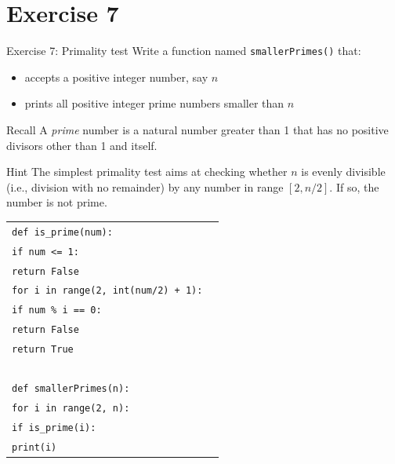 \documentclass[t,handout,9pt]{beamer}
\begin{document}
\section{Exercise 7}
\begin{frame}{Exercise 7: Primality test}
\vfill
Write a function named \texttt{smallerPrimes()} that:
\begin{itemize}
	\item accepts a positive integer number, say $n$
	\item prints all positive integer prime numbers smaller than $n$
\end{itemize}
\vfill
\begin{block}{Recall}
A \textit{prime} number is a natural number greater than 1 that has no positive divisors other than 1 and itself.
\end{block}
\begin{block}{Hint}
The simplest primality test aims at checking whether $n$ is evenly divisible (i.e., division with no remainder) by any number in range $[2, n/2]$. If so, the number is not prime.
\end{block}
\vfill
\end{frame}
%
\begin{frame}
	\vfill
		\begin{table}[]
		  \begin{flushleft}
		  \begin{tabular}{ll}
			\texttt{def is\_prime(num):}        & \\
			\texttt{\quad if num <= 1:}        & \\
			\texttt{\quad\quad	return False}        & \\
			\texttt{\quad for i in range(2, int(num/2) + 1):}        & \\
			\texttt{\quad\quad	if num \% i == 0:}        & \\
			\texttt{\quad\quad\quad		return False}        & \\
			\texttt{\quad return True}        & \\
		  	\texttt{ } &  \\
			\texttt{def smallerPrimes(n):}        & \\
			\texttt{\quad for i in range(2, n):}        & \\
			\texttt{\quad\quad if is\_prime(i):}        & \\
			\texttt{\quad\quad\quad print(i)}        & \\
		  \end{tabular}
		  \end{flushleft}
		\end{table}
	\vfill
\end{frame}
\end{document}
